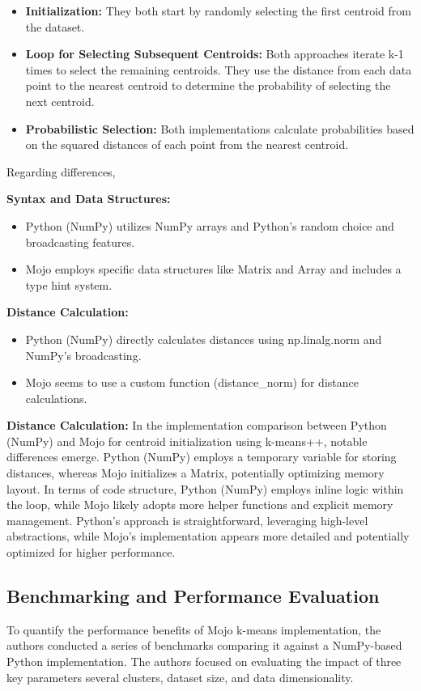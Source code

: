 \documentclass[conference]{IEEEtran}
\begin{document}
\begin{itemize}
    \item \textbf{Initialization:} They both start by randomly selecting the first centroid from the dataset.
    \item \textbf{Loop for Selecting Subsequent Centroids:} Both approaches iterate k-1 times to select the remaining centroids. They use the distance from each data point to the nearest centroid to determine the probability of selecting the next centroid.
    \item \textbf{Probabilistic Selection:} Both implementations calculate probabilities based on the squared distances of each point from the nearest centroid.
\end{itemize}

Regarding differences,


\textbf{Syntax and Data Structures:}
\begin{itemize}
    \item Python (NumPy) utilizes NumPy arrays and Python's random choice and broadcasting features.
    \item Mojo employs specific data structures like Matrix and Array and includes a type hint system.
\end{itemize}

\textbf{Distance Calculation:}
\begin{itemize}
    \item Python (NumPy) directly calculates distances using np.linalg.norm and NumPy's broadcasting.
    \item Mojo seems to use a custom function (distance\_norm) for distance calculations.
\end{itemize}

\textbf{Distance Calculation:}
In the implementation comparison between Python (NumPy) and Mojo for centroid initialization using k-means++, notable differences emerge. Python (NumPy) employs a temporary variable for storing distances, whereas Mojo initializes a Matrix, potentially optimizing memory layout. In terms of code structure, Python (NumPy) employs inline logic within the loop, while Mojo likely adopts more helper functions and explicit memory management. Python's approach is straightforward, leveraging high-level abstractions, while Mojo's implementation appears more detailed and potentially optimized for higher performance.



\subsection{Benchmarking and Performance Evaluation}
To quantify the performance benefits of Mojo k-means implementation, the authors conducted a series of benchmarks comparing it against a NumPy-based Python implementation. The authors focused on evaluating the impact of three key parameters several clusters, dataset size, and data dimensionality.
\end{document}
